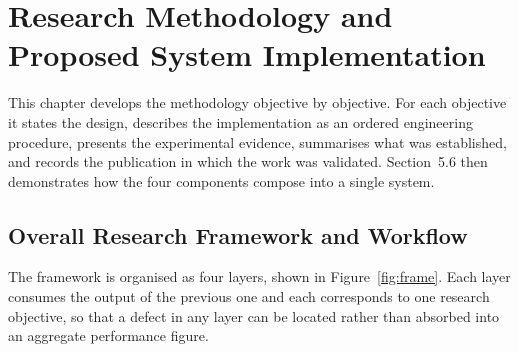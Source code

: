 \chapter{Research Methodology and Proposed System Implementation}

This chapter develops the methodology objective by objective. For each objective it
states the design, describes the implementation as an ordered engineering procedure,
presents the experimental evidence, summarises what was established, and records the
publication in which the work was validated. Section~5.6 then demonstrates how the four
components compose into a single system.

\section{Overall Research Framework and Workflow}

The framework is organised as four layers, shown in Figure~\ref{fig:frame}. Each layer
consumes the output of the previous one and each corresponds to one research objective,
so that a defect in any layer can be located rather than absorbed into an aggregate
performance figure.

